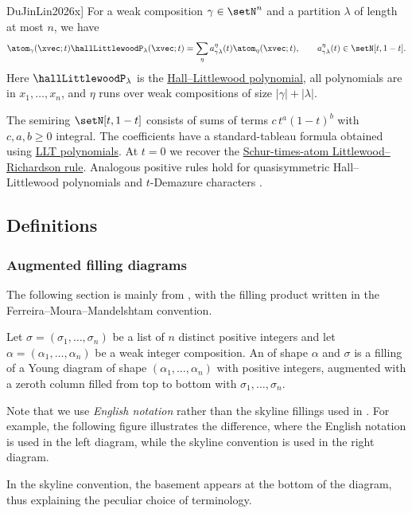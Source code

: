 \begin{theorem}[Du--Jin--Lin, \cite[Thm.~1.3]{DuJinLin2026x}]
For a weak composition $\gamma\in\setN^n$ and a partition $\lambda$
of length at most $n$, we have
\[
 \atom_\gamma(\xvec;t)\hallLittlewoodP_\lambda(\xvec;t)
 =\sum_\eta a^\eta_{\gamma\lambda}(t)\atom_\eta(\xvec;t),
 \qquad a^\eta_{\gamma\lambda}(t)\in\setN[t,1-t].
\]
Here $\hallLittlewoodP_\lambda$ is the
\hyperref[hallLittlewoodP]{Hall--Littlewood polynomial}, all polynomials
are in $x_1,\dotsc,x_n$, and $\eta$ runs over weak
compositions of size $|\gamma|+|\lambda|$.
\end{theorem}

The semiring $\setN[t,1-t]$ consists of sums of terms
$c\,t^a(1-t)^b$ with $c,a,b\geq0$ integral.
The coefficients have a standard-tableau formula obtained using
\hyperref[LLT]{LLT polynomials}. At $t=0$ we recover the
\hyperref[keyProduct]{Schur-times-atom Littlewood--Richardson rule}.
Analogous positive rules hold for
quasisymmetric Hall--Littlewood polynomials and $t$-Demazure characters
\cite[Cor.~1.1--1.2]{DuJinLin2026x}.

\subsection[macdonaldEpermDefinition]{Definitions}

\subsubsection[permutedBasementFillingDiagrams]{Augmented filling diagrams}

The following section is mainly from \cite{Alexandersson2015gbMacdonald},
with the filling product written in the Ferreira--Moura--Mandelshtam
convention.

Let $\sigma = (\sigma_1,\dotsc,\sigma_n)$ be a list of $n$ distinct positive
integers and let $\alpha=(\alpha_1,\dotsc,\alpha_n)$ be a weak integer
composition.
An \label{augmentedFilling} of shape $\alpha$ and
\label{basement} $\sigma$ is a filling of a Young diagram of
shape $(\alpha_1,\dotsc,\alpha_n)$ with positive integers, augmented with a
zeroth column filled from top to bottom with $\sigma_1,\dotsc,\sigma_n$.

Note that we use \emph{English notation} rather than the
skyline fillings used in \cite{HaglundHaimanLoehr2008,Mason2009}.
For example, the following figure illustrates the difference,
where the English notation is used in the left diagram, while the skyline
convention is used in the right diagram.
\begin{figure}
\end{figure}
In the skyline convention, the basement appears at the bottom of the diagram,
thus explaining the peculiar choice of terminology.

